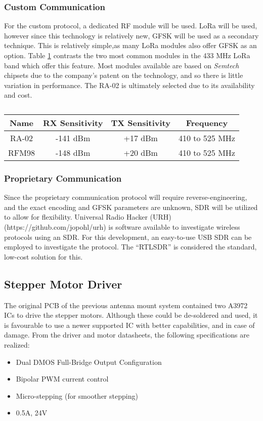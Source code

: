 \subsubsection{Custom Communication}
For the custom protocol, a dedicated RF module will be used. LoRa will be used, however since this technology is relatively new, GFSK will be used as a secondary technique. This is relatively simple,as many LoRa modules also offer GFSK as an option. Table \ref{tab:rfTransceivers} contrasts the two most common modules in the 433 MHz LoRa band which offer this feature. Most modules available are based on \textit{Semtech} chipsets due to the company's patent on the technology, and so there is little variation in performance. The RA-02 is ultimately selected due to its availability and cost.

\begin{table}[!htb]
  \centering
  \renewcommand{\arraystretch}{1.2}
  \begin{tabular}{ |c|c|c|c| }
  \hline
  \textbf{Name}   & \textbf{RX Sensitivity} & \textbf{TX Sensitivity}& \textbf{Frequency} \\
  \hline
  RA-02           & -141 dBm             & +17 dBm              & 410 to 525 MHz     \\
  RFM98           & -148 dBm             & +20 dBm              & 410 to 525 MHz     \\
  \hline
  \end{tabular}
  \caption{}
  \label{tab:rfTransceivers}
\end{table}

\subsubsection{Proprietary Communication}
Since the proprietary communication protocol will require reverse-engineering, and the exact encoding and GFSK parameters are unknown, SDR will be utilized to allow for flexibility. Universal Radio Hacker (URH) (https://github.com/jopohl/urh) is software available to investigate wireless protocols using an SDR. For this development, an easy-to-use USB SDR can be employed to investigate the protocol. The “RTLSDR” is considered the standard, low-cost solution for this.

\subsection{Stepper Motor Driver}
The original PCB of the previous antenna mount system contained two A3972 ICs to drive the stepper motors. Although these could be de-soldered and used, it is favourable to use a newer supported IC with better capabilities, and in case of damage. From the driver and motor datasheets, the following specifications are realized:
\begin{itemize}
    \item Dual DMOS Full-Bridge Output Configuration
    \item Bipolar PWM current control
    \item Micro-stepping (for smoother stepping)
    \item 0.5A, 24V
\end{itemize}

